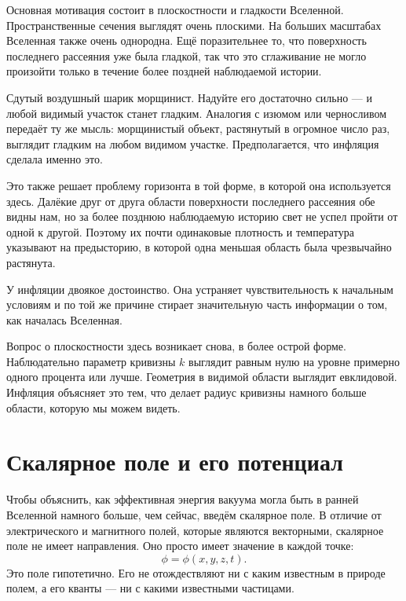 Основная мотивация состоит в плоскостности и гладкости Вселенной. Пространственные сечения выглядят очень плоскими. На больших масштабах Вселенная также очень однородна. Ещё поразительнее то, что поверхность последнего рассеяния уже была гладкой, так что это сглаживание не могло произойти только в течение более поздней наблюдаемой истории.

Сдутый воздушный шарик морщинист. Надуйте его достаточно сильно — и любой видимый участок станет гладким. Аналогия с изюмом или черносливом передаёт ту же мысль: морщинистый объект, растянутый в огромное число раз, выглядит гладким на любом видимом участке. Предполагается, что инфляция сделала именно это.

Это также решает проблему горизонта в той форме, в которой она используется здесь. Далёкие друг от друга области поверхности последнего рассеяния обе видны нам, но за более позднюю наблюдаемую историю свет не успел пройти от одной к другой. Поэтому их почти одинаковые плотность и температура указывают на предысторию, в которой одна меньшая область была чрезвычайно растянута.

У инфляции двоякое достоинство. Она устраняет чувствительность к начальным условиям и по той же причине стирает значительную часть информации о том, как началась Вселенная.

Вопрос о плоскостности здесь возникает снова, в более острой форме. Наблюдательно параметр кривизны \(k\) выглядит равным нулю на уровне примерно одного процента или лучше. Геометрия в видимой области выглядит евклидовой. Инфляция объясняет это тем, что делает радиус кривизны намного больше области, которую мы можем видеть.

\begin{classroomqa}
\end{classroomqa}

\section{Скалярное поле и его потенциал}

Чтобы объяснить, как эффективная энергия вакуума могла быть в ранней Вселенной намного больше, чем сейчас, введём скалярное поле. В отличие от электрического и магнитного полей, которые являются векторными, скалярное поле не имеет направления. Оно просто имеет значение в каждой точке:
\begin{equation}
\phi=\phi(x,y,z,t).
\end{equation}
Это поле гипотетично. Его не отождествляют ни с каким известным в природе полем, а его кванты — ни с какими известными частицами.

